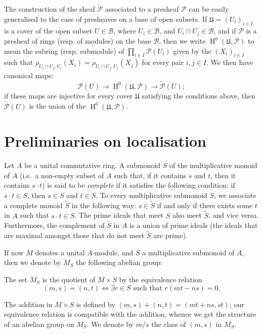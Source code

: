 \documentclass[british]{article}
\newcommand{\oldpage}[1]{\marginpar{\footnotesize$\Big\vert$ \textit{p.~#1}}}
\begin{document}
The construction of the sheaf \(\widetilde{{\mathscr{P}}}\) associated
to a presheaf \({\mathscr{P}}\) can be easily generalised to the case of
presheaves on a base of open subsets. If \(\mathfrak{U}=(U_i)_{i\in I}\)
is a cover of the open subset \(U\in\mathscr{B}\), where
\(U_i\in\mathscr{B}\), and \(U_i\cap U_j\in\mathscr{B}\), and if
\({\mathscr{P}}\) is a presheaf of rings (resp. of modules) on the base
\(\mathscr{B}\), then we write
\(\operatorname{H}^0(\mathfrak{U},{\mathscr{P}})\) to mean the subring
(resp. submodule) of \(\prod_{i\in I}{\mathscr{P}}(U_i)\) given by the
\((X_i)_{i\in I}\) such that
\(\rho_{U_i\cap U_j,U_i}(X_i) = \rho_{U_i\cap U_j,U_j}(X_j)\) for every
pair \(i,j\in I\). We then have canonical maps: \[
  {\mathscr{P}}(U) \to \operatorname{H}^0(\mathfrak{U},{\mathscr{P}}) \to \widetilde{{\mathscr{P}}}(U);
\] if these maps are injective for every cover \(\mathfrak{U}\)
satisfying the conditions above, then \(\widetilde{{\mathscr{P}}}(U)\)
is the union of the \(\operatorname{H}^0(\mathfrak{U},{\mathscr{P}})\).

\section{Preliminaries on localisation}\label{section-1}

Let \(A\) be a unital commutative ring. A submonoid \(S\) of the
multiplicative monoid of \(A\) (i.e.~a non-empty subset of \(A\) such
that, if it contains \(s\) and \(t\), then it contains \(s\cdot t\)) is
said to be \emph{complete} if it satisfies the following condition: if
\(s\cdot t\in S\), then \(s\in S\) and \(t\in S\). \oldpage{1-02} To
every multiplicative submonoid \(S\), we associate a complete monoid
\(\widetilde{S}\) in the following way: \(s\in\widetilde{S}\) if and
only if there exists some \(t\) in \(A\) such that \(s\cdot t\in S\).
The prime ideals that meet \(S\) also meet \(\widetilde{S}\), and vice
versa. Furthermore, the complement of \(\widetilde{S}\) in \(A\) is a
union of prime ideals (the ideals that are maximal amongst those that do
not meet \(\widetilde{S}\) are prime).

If now \(M\) denotes a unital \(A\)-module, and \(S\) a multiplicative
submonoid of \(A\), then we denote by \(M_S\) the following abelian
group:

The set \(M_S\) is the quotient of \(M\times S\) by the equivalence
relation \[
  (m,s) = (n,t) \iff \exists r\in S\text{ such that }r(mt-ns)=0.
\]

The addition in \(M\times S\) is defined by \((m,s)+(n,t)=(mt+ns,st)\);
our equivalence relation is compatible with the addition, whence we get
the structure of an abelian group on \(M_S\). We denote by \(m/s\) the
class of \((m,s)\) in \(M_S\).
\end{document}
